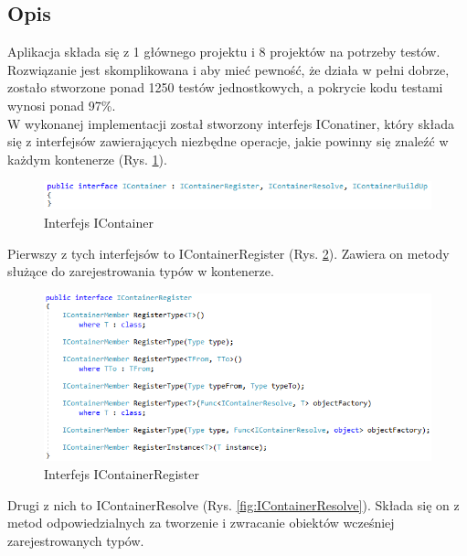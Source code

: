 \documentclass[12pt]{article}
\begin{document}
\subsection{Opis}
Aplikacja składa się z 1 głównego projektu i 8 projektów na potrzeby testów. Rozwiązanie jest skomplikowana i aby mieć pewność, że działa w pełni dobrze, zostało stworzone  ponad 1250 testów jednostkowych, a pokrycie kodu testami wynosi ponad 97\%.\\

W wykonanej implementacji został stworzony interfejs IConatiner, który składa się z interfejsów zawierających niezbędne operacje, jakie powinny się znaleźć w każdym kontenerze (Rys. \ref{fig:IContainer}).\\
\begin{figure}[H]
	\begin{center}
  		\includegraphics{IContainer.png}
  		\caption{Interfejs IContainer}
  		\label{fig:IContainer}
	\end{center}
\end{figure}
Pierwszy z tych interfejsów to IContainerRegister (Rys. \ref{fig:IContainerRegister}). Zawiera on metody służące do zarejestrowania typów w kontenerze.\\
\begin{figure}[H]
	\begin{center}
  		\includegraphics{IContainerRegister.png}
  		\caption{Interfejs IContainerRegister}
  		\label{fig:IContainerRegister}
	\end{center}
\end{figure}
Drugi z nich to IContainerResolve (Rys. \ref{fig:IContainerResolve}). Składa się on z metod odpowiedzialnych za  tworzenie i zwracanie obiektów wcześniej zarejestrowanych typów.\\ \\
\end{document}

